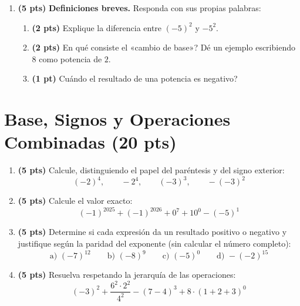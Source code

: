 \documentclass[12pt, letterpaper]{article}
\begin{document}
\begin{enumerate}[leftmargin=*]
  \item \textbf{(5 pts)} \textbf{Definiciones breves.} Responda con sus propias palabras:
        \begin{enumerate}[label=\alph*)]
          \item \textbf{(2 pts)} Explique la diferencia entre $(-5)^{2}$ y $-5^{2}$.
          \item \textbf{(2 pts)} \textquestiondown En qué consiste el «cambio de base»? Dé un ejemplo escribiendo $8$ como potencia de $2$.
          \item \textbf{(1 pt)} \textquestiondown Cuándo el resultado de una potencia es negativo?
        \end{enumerate}
\end{enumerate}

\vspace{6pt}

\section{Base, Signos y Operaciones Combinadas (20 pts)}

\begin{enumerate}[leftmargin=*]
  \item \textbf{(5 pts)} Calcule, distinguiendo el papel del paréntesis y del signo exterior:
        \[
          (-2)^4, \qquad -2^4, \qquad (-3)^3, \qquad -(-3)^2
        \]

  \item \textbf{(5 pts)} Calcule el valor exacto:
        \[
          (-1)^{2025} + (-1)^{2026} + 0^{7} + 10^{0} - (-5)^{1}
        \]

  \item \textbf{(5 pts)} Determine si cada expresión da un resultado positivo o negativo y justifique según la paridad del exponente (sin calcular el número completo):
        \[
          \text{a) } (-7)^{12} \qquad \text{b) } (-8)^{9} \qquad \text{c) } (-5)^{0} \qquad \text{d) } -(-2)^{15}
        \]

  \item \textbf{(5 pts)} Resuelva respetando la jerarquía de las operaciones:
        \[
          (-3)^{2} + \frac{6^{2} \cdot 2^{2}}{4^{2}} - (7 - 4)^{3} + 8 \cdot (1 + 2 + 3)^{0}
        \]
\end{enumerate}

\newpage
\end{document}
